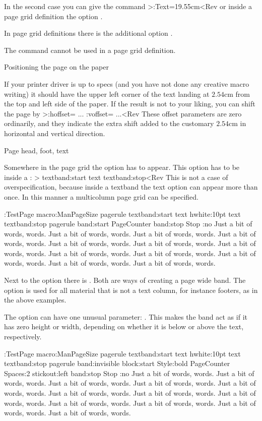 In the second case you can give the command
\Ver>\Height:Text=19.55cm<Rev or inside a page grid definition the
option .

In page grid definitions there is the additional option
.

The  command cannot be used in a page grid definition.

\Section Positioning the page on the paper

If your printer driver is up to specs (and you have not done any
creative macro writing) it should have the upper left corner of the
text landing at $2.54$cm from the top and left side of the paper.
If the result is not to your liking, you can shift the page by
\Ver>\Distance:hoffset= ...
\Distance:voffset= ...<Rev
These offset parameters are zero ordinarily, and they indicate the
extra shift added to the customary $2.54$cm in horizontal and
vertical direction.
 
\Section Page head, foot, text

Somewhere in the page grid the option  has to appear. This
option has to be inside a :
\Ver>    textband:start text textband:stop<Rev
This is not a case of overspecification, because inside a textband
the text option can appear more than once. In this manner a multicolumn
page grid can be specified.

\def\sometext{Just a bit of words, words. }
\edef\sometext{\sometext\sometext\sometext}
\edef\sometext{\sometext\sometext\sometext\sometext}
\OutExample
\DefinePageGrid:TestPage macro:ManPageSize
 pagerule textband:start text hwhite:10pt text textband:stop
 pagerule band:start PageCounter band:stop Stop
\FlushRight:no \sometext
\OutExampleStop

Next to the option  there is .
Both are ways of
creating a page wide band. The option  is used for all
material that is not a text column, for instance footers, as in the
above examples.

The option  can have one unusual parameter: .
This makes the band act as if it has zero height or width, depending
on whether it is below or above the text, respectively.

\OutExample
\DefinePageGrid:TestPage macro:ManPageSize
 pagerule textband:start text hwhite:10pt text textband:stop
 pagerule 
 band:invisible block:start Style:bold PageCounter Spaces:2
     stickout:left band:stop Stop
\FlushRight:no \sometext
\OutExampleStop
 
